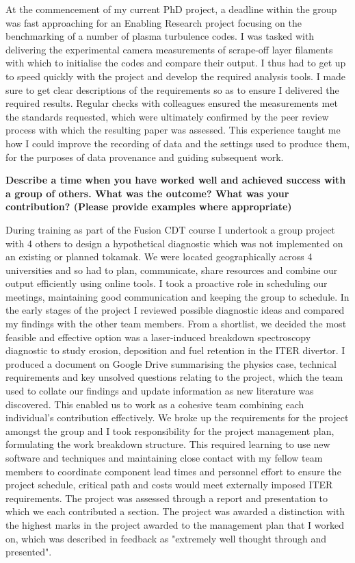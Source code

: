\documentclass[11pt,a4paper,sans]{moderncv}        %
\begin{document}
At the commencement of my current PhD project, a deadline within the group was fast approaching for an Enabling Research project focusing on the benchmarking of a number of plasma turbulence codes. I was tasked with delivering the experimental camera measurements of scrape-off layer filaments with which to initialise the codes and compare their output. I thus had to get up to speed quickly with the project and develop the required analysis tools. I made sure to get clear descriptions of the requirements so as to ensure I delivered the required results. Regular checks with colleagues ensured the measurements met the standards requested, which were ultimately confirmed by the peer review process with which the resulting paper was assessed. This experience taught me how I could improve the recording of data and the settings used to produce them, for the purposes of data provenance and guiding subsequent work.


\textbf{Describe a time when you have worked well and achieved success with a group of others. What was the outcome? What was your contribution? (Please provide examples where appropriate) }

During training as part of the Fusion CDT course I undertook a group project with 4 others to design a hypothetical diagnostic which was not implemented on an existing or planned tokamak. We were located geographically across 4 universities and so had to plan, communicate, share resources and combine our output efficiently using online tools.  I took a proactive role in scheduling our meetings, maintaining good communication and keeping the group to schedule. In the early stages of the project I reviewed possible diagnostic ideas and compared my findings with the other team members.  From a shortlist, we decided the most feasible and effective option was a laser-induced breakdown spectroscopy diagnostic to study erosion, deposition and fuel retention in the ITER divertor. I produced a document on Google Drive summarising the physics case, technical requirements and key unsolved questions relating to the project, which the team used to collate our findings and update information as new literature was discovered. This enabled us to work as a cohesive team combining each individual's contribution effectively. We broke up the requirements for the project amongst the group and I took responsibility for the project management plan, formulating the work breakdown structure. This required learning to use new software and techniques and maintaining close contact with my fellow team members to coordinate component lead times and personnel effort to ensure the project schedule, critical path and costs would meet externally imposed ITER requirements. The project was assessed through a report and presentation to which we each contributed a section. The project was awarded a distinction with the highest marks in the project awarded to the management plan that I worked on, which was described in feedback as "extremely     well     thought     through     and     presented".
\end{document}
